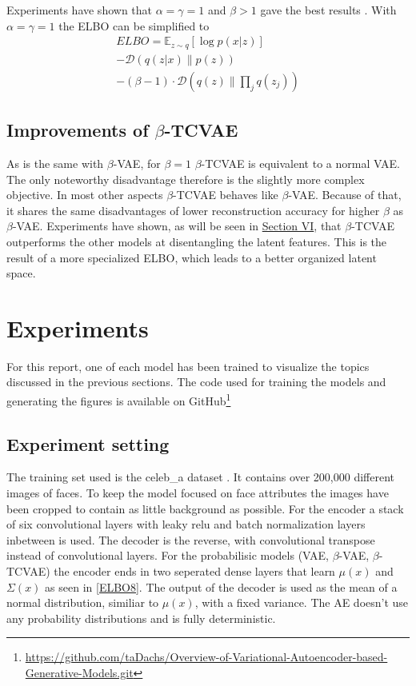 \documentclass[a4paper]{IEEEtran}
\begin{document}
{Experiments have shown that $\alpha = \gamma = 1$ and $\beta > 1$ gave the best results \cite{chen2019isolating}. With $\alpha = \gamma = 1$ the ELBO can be simplified to
\begin{align*}
	ELBO = \mathbb{E}_{z \sim q}\left[ \log p(x|z) \right]\\
	 - \mathcal{D}(q(z|x) \| p(z))\\
	 - (\beta - 1) \cdot \mathcal{D}(q(z) \| \prod_j q(z_j))
\end{align*}

\subsection{Improvements of $\beta$-TCVAE}
As is the same with $\beta$-VAE, for $\beta = 1$ $\beta$-TCVAE is equivalent to a normal VAE. The only noteworthy disadvantage therefore is the slightly more complex objective. In most other aspects $\beta$-TCVAE behaves like $\beta$-VAE. Because of that, it shares the same disadvantages of lower reconstruction accuracy for higher $\beta$ as $\beta$-VAE. Experiments have shown, as will be seen in \hyperref[sec:experiments]{Section VI}, that $\beta$-TCVAE outperforms the other models at disentangling the latent features. This is the result of a more specialized ELBO, which leads to a better organized latent space. 

\section{Experiments}
\label{sec:experiments}


For this report, one of each model has been trained to visualize the topics discussed in the previous sections. The code used for training the models and generating the figures is available on GitHub\footnote{\url{https://github.com/taDachs/Overview-of-Variational-Autoencoder-based-Generative-Models.git}}

\subsection{Experiment setting}
The training set used is the celeb\_a dataset \cite{liu2015faceattributes}. It contains over 200,000 different images of faces. To keep the model focused on face attributes the images have been cropped to contain as little background as possible. For the encoder a stack of six convolutional layers with leaky relu and batch normalization layers inbetween is used. The decoder is the reverse, with convolutional transpose instead of convolutional layers. For the probabilisic models (VAE, $\beta$-VAE, $\beta$-TCVAE) the encoder ends in two seperated dense layers that learn $\mu(x)$ and $\Sigma(x)$ as seen in \eqref{ELBO8}. The output of the decoder is used as the mean of a normal distribution, similiar to $\mu(x)$, with a fixed variance. The AE doesn't use any probability distributions and is fully deterministic.

}
\end{document}
